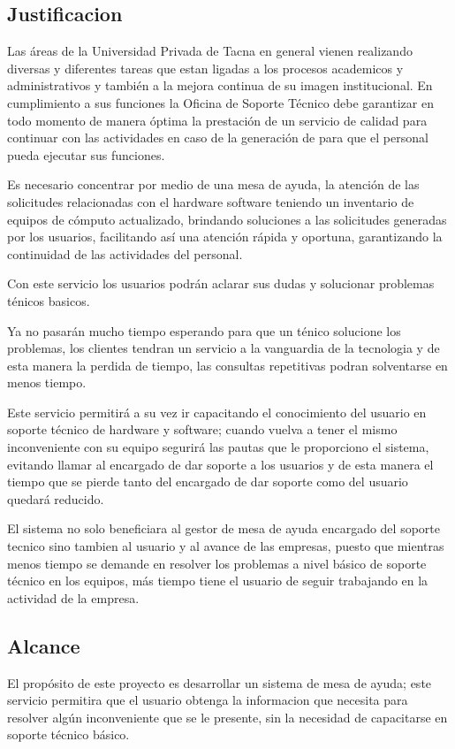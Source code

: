 \documentclass[preprint,12pt]{elsarticle}
\begin{document}
\subsection {\textbf{Justificacion}}

Las áreas de la Universidad Privada de Tacna en general vienen realizando diversas y diferentes tareas que estan ligadas a los procesos academicos y administrativos y también a la mejora continua de su imagen institucional.
En cumplimiento a sus funciones la Oficina de Soporte Técnico debe garantizar en todo momento de manera óptima la prestación de un servicio de calidad para continuar con las actividades en caso de la generación de para que el personal pueda ejecutar sus funciones.
 
Es necesario concentrar por medio de una mesa de ayuda, la atención de las solicitudes relacionadas con el hardware  software teniendo un inventario de equipos de cómputo actualizado, brindando soluciones a las solicitudes generadas por los usuarios, facilitando así una atención rápida y oportuna, garantizando la continuidad de las actividades del personal.

Con este servicio los usuarios podrán aclarar sus dudas y solucionar problemas ténicos basicos.

Ya no pasarán mucho tiempo esperando para que un ténico solucione los problemas, los clientes tendran un servicio a la vanguardia de la tecnologia y de esta manera la perdida de tiempo, las consultas repetitivas podran solventarse en menos tiempo.

Este servicio permitirá a su vez ir capacitando el conocimiento del usuario en soporte técnico de hardware y software; cuando vuelva a tener el mismo inconveniente con su equipo segurirá las pautas que le proporciono el sistema, evitando llamar al encargado de dar soporte a los usuarios y de esta manera el tiempo que se pierde tanto del encargado de dar soporte como del usuario quedará reducido.

El sistema no solo beneficiara al gestor de mesa de ayuda encargado del soporte tecnico sino tambien al usuario y al avance de las empresas, puesto que mientras menos tiempo se demande en resolver los problemas a nivel básico de soporte técnico en los equipos, más tiempo tiene el usuario de seguir trabajando en la actividad de la empresa.



\subsection {\textbf{Alcance}}
El propósito de este proyecto es desarrollar un sistema de mesa de ayuda; este servicio permitira que el usuario obtenga la informacion que necesita para resolver algún inconveniente que se le presente, sin la necesidad de capacitarse en soporte técnico básico.
\end{document}
